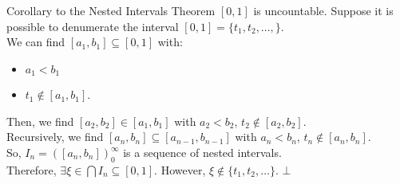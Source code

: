 \documentclass[10pt]{extarticle}
\begin{document}
  \begin{problem}{Corollary to the Nested Intervals Theorem}
    $[0,1]$ is uncountable.
    \tcblower
    Suppose it is possible to denumerate the interval $[0,1] = \{t_1,t_2,\dots,\}$.\\

    We can find $[a_1,b_1]\subseteq [0,1]$ with:
    \begin{itemize}
      \item $a_1 < b_1$
      \item $t_1\notin [a_1,b_1]$.
    \end{itemize}
    Then, we find $[a_2,b_2]\in [a_1,b_1]$ with $a_2 < b_2$, $t_2\notin [a_2,b_2]$.\\

    Recursively, we find $[a_n,b_n]\subseteq [a_{n-1},b_{n-1}]$ with $a_n < b_n$, $t_n\notin [a_n,b_n]$.\\

    So, $I_n = ([a_n,b_n])_{0}^{\infty}$ is a sequence of nested intervals.\\

    Therefore, $\exists \xi\in \bigcap I_n \subseteq [0,1]$. However, $\xi \notin \{t_1,t_2,\dots\}$. $\bot$
  \end{problem}
\end{document}
